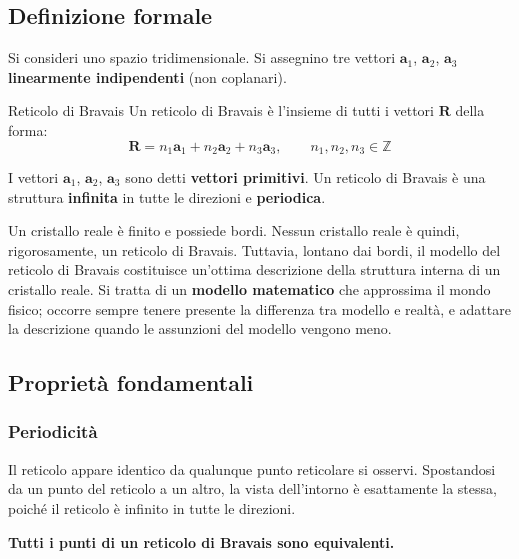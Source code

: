 \subsection*{Definizione formale}

Si consideri uno spazio tridimensionale. Si assegnino tre vettori $\mathbf{a}_1$, $\mathbf{a}_2$, $\mathbf{a}_3$ \textbf{linearmente indipendenti} (non coplanari).

\begin{definizione}{Reticolo di Bravais}
Un reticolo di Bravais è l'insieme di tutti i vettori $\mathbf{R}$ della forma:
\begin{equation}
\mathbf{R} = n_1 \mathbf{a}_1 + n_2 \mathbf{a}_2 + n_3 \mathbf{a}_3, \qquad n_1, n_2, n_3 \in \mathbb{Z}
\end{equation}
\end{definizione}

I vettori $\mathbf{a}_1$, $\mathbf{a}_2$, $\mathbf{a}_3$ sono detti \textbf{vettori primitivi}. Un reticolo di Bravais è una struttura \textbf{infinita} in tutte le direzioni e \textbf{periodica}.


Un cristallo reale è finito e possiede bordi. Nessun cristallo reale è quindi, rigorosamente, un reticolo di Bravais. Tuttavia, lontano dai bordi, il modello del reticolo di Bravais costituisce un'ottima descrizione della struttura interna di un cristallo reale. Si tratta di un \textbf{modello matematico} che approssima il mondo fisico; occorre sempre tenere presente la differenza tra modello e realtà, e adattare la descrizione quando le assunzioni del modello vengono meno.


\subsection*{Proprietà fondamentali}

\subsubsection{Periodicità}
Il reticolo appare identico da qualunque punto reticolare si osservi. Spostandosi da un punto del reticolo a un altro, la vista dell'intorno è esattamente la stessa, poiché il reticolo è infinito in tutte le direzioni.

\begin{nota}
\textbf{Tutti i punti di un reticolo di Bravais sono equivalenti.}
\end{nota}


